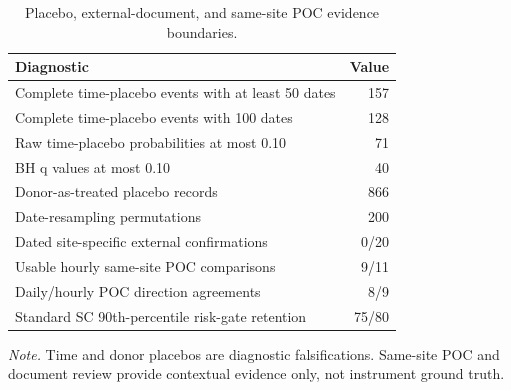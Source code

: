 \begin{table}[!ht]
\centering
\caption{Placebo, external-document, and same-site POC evidence boundaries.}
\label{tab:placebo-external}
\scriptsize
\begin{tabular}{lr}
\toprule
Diagnostic & Value \\
\midrule
Complete time-placebo events with at least 50 dates & 157 \\
Complete time-placebo events with 100 dates & 128 \\
Raw time-placebo probabilities at most 0.10 & 71 \\
BH q values at most 0.10 & 40 \\
Donor-as-treated placebo records & 866 \\
Date-resampling permutations & 200 \\
Dated site-specific external confirmations & 0/20 \\
Usable hourly same-site POC comparisons & 9/11 \\
Daily/hourly POC direction agreements & 8/9 \\
Standard SC 90th-percentile risk-gate retention & 75/80 \\
\bottomrule
\end{tabular}
\par\smallskip
\begin{minipage}{0.94\linewidth}
\footnotesize\textit{Note.} Time and donor placebos are diagnostic falsifications. Same-site POC and document review provide contextual evidence only, not instrument ground truth.
\end{minipage}
\end{table}
